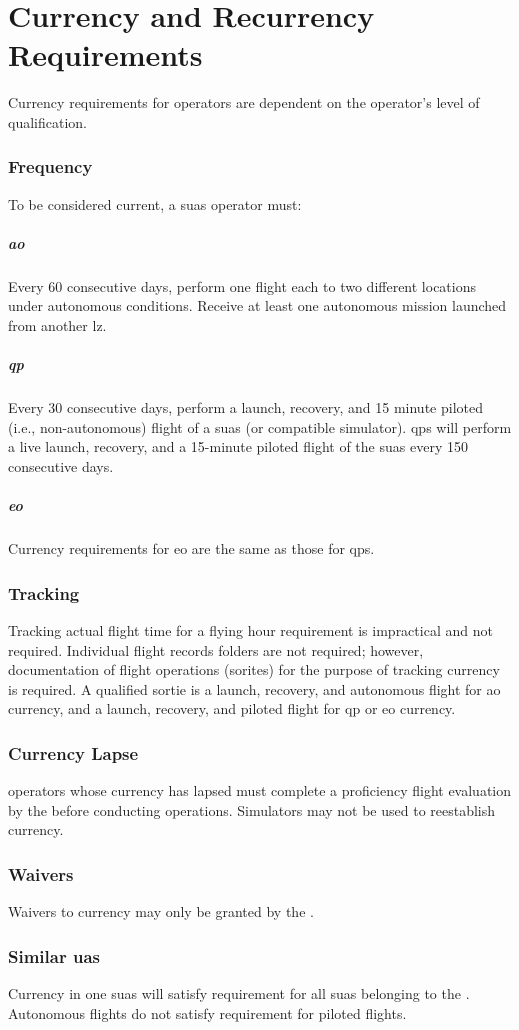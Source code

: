    \section{Currency and Recurrency Requirements}\label{sec:currencyreqs}

            Currency requirements for \projectmars{} operators are dependent on the operator's level of qualification. 

                \subsubsection{Frequency} To be considered current, a \projectmars{} \ac{suas} operator must:

                    \subparagraph{\acf{ao}} Every 60 consecutive days, perform one flight each to two different locations under autonomous conditions.  Receive at least one autonomous mission launched from another \ac{lz}. 

                    \subparagraph{\acf{qp}} Every 30 consecutive days, perform a launch, recovery, and 15 minute piloted (i.e., non-autonomous) flight of a \projectmars{} \ac{suas} (or compatible simulator). \ac{qp}s will perform a live launch, recovery, and a 15-minute piloted flight of the \ac{suas} every 150 consecutive days.

                    \subparagraph{\acf{eo}} Currency requirements for \ac{eo} are the same as those for \ac{qp}s.

                \subsubsection{Tracking} Tracking actual flight time for a flying hour requirement is impractical and not required. Individual flight records folders are not required; however, documentation of flight operations (sorites) for the purpose of tracking currency is required. A qualified sortie is a launch, recovery, and autonomous flight for \ac{ao} currency, and a launch, recovery, and piloted flight for \ac{qp} or \ac{eo} currency.

                \subsubsection{Currency Lapse} \projectmars{} operators whose currency has lapsed must complete a proficiency flight evaluation by the  before conducting operations. Simulators may not be used to reestablish currency.

                \subsubsection{Waivers} Waivers to currency may only be granted by the .

                \subsubsection{Similar \ac{uas}}  Currency in one \projectmars{} \ac{suas} will satisfy requirement for all \ac{suas} belonging to the \projectmars{}.  Autonomous flights do not satisfy requirement for piloted flights. 
                